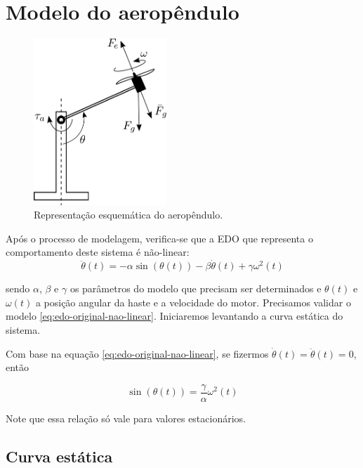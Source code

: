 \documentclass[a4paper,12pt]{exam}
\begin{document}
\newpage


\section{Modelo do aeropêndulo}

\begin{figure}
    \centering
    \includegraphics[width=5cm]{figs/aeropendulo/fig.pdf}
    \caption{Representação esquemática do aeropêndulo.}
    \label{fig:esquematico-aeropendulo}
\end{figure}


Após o processo de modelagem, verifica-se que a EDO que representa o comportamento deste sistema é não-linear:
%
\begin{equation}
  \label{eq:edo-original-nao-linear}
  \ddot{\theta}(t) = -\alpha \sin(\theta(t)) - \beta \dot{\theta}(t) + \gamma \omega^2(t)
\end{equation}

\noindent sendo $\alpha$, $\beta$ e $\gamma$ os parâmetros do modelo que precisam ser determinados e $\theta(t)$ e $\omega(t)$ a posição angular da haste e a velocidade do motor. Precisamos validar o modelo \eqref{eq:edo-original-nao-linear}. Iniciaremos levantando a curva estática do sistema.

Com base na equação \eqref{eq:edo-original-nao-linear}, se fizermos $\dot{\theta}(t) = \ddot{\theta}(t) = 0$, então

\begin{equation}
    \sin(\theta(t)) = \frac{\gamma}{\alpha} \omega^2(t)
\end{equation}

Note que essa relação só vale para valores estacionários.

\vspace*{5mm}
\subsection{Curva estática}
\end{document}
